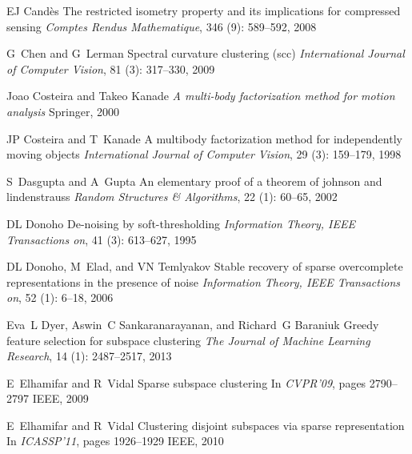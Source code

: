 \documentclass[12pt,heading]{ctexbook}
\begin{document}
\begin{thebibliography}{99}
    EJ Cand{\`e}s
    \newblock The restricted isometry property and its implications for compressed
    sensing
    \newblock \emph{Comptes Rendus Mathematique}, 346 (9):
    589--592, 2008

    G~Chen and G~Lerman
    \newblock Spectral curvature clustering (scc)
    \newblock \emph{International Journal of Computer Vision}, 81
    (3): 317--330, 2009

    Joao Costeira and Takeo Kanade
    \newblock \emph{A multi-body factorization method for motion analysis}
    \newblock Springer, 2000

    JP Costeira and T~Kanade
    \newblock A multibody factorization method for independently moving objects
    \newblock \emph{International Journal of Computer Vision}, 29
    (3): 159--179, 1998

    S~Dasgupta and A~Gupta
    \newblock An elementary proof of a theorem of johnson and lindenstrauss
    \newblock \emph{Random Structures \& Algorithms}, 22 (1):
    60--65, 2002

    DL Donoho
    \newblock De-noising by soft-thresholding
    \newblock \emph{Information Theory, IEEE Transactions on}, 41
    (3): 613--627, 1995

    DL Donoho, M~Elad, and VN Temlyakov
    \newblock Stable recovery of sparse overcomplete representations in the
    presence of noise
    \newblock \emph{Information Theory, IEEE Transactions on}, 52
    (1): 6--18, 2006

    Eva~L Dyer, Aswin~C Sankaranarayanan, and Richard~G Baraniuk
    \newblock Greedy feature selection for subspace clustering
    \newblock \emph{The Journal of Machine Learning Research}, 14
    (1): 2487--2517, 2013

    E~Elhamifar and R~Vidal
    \newblock Sparse subspace clustering
    \newblock In \emph{CVPR'09}, pages 2790--2797 IEEE, 2009

    E~Elhamifar and R~Vidal
    \newblock Clustering disjoint subspaces via sparse representation
    \newblock In \emph{ICASSP'11}, pages 1926--1929 IEEE, 2010


\end{thebibliography}
\end{document}
